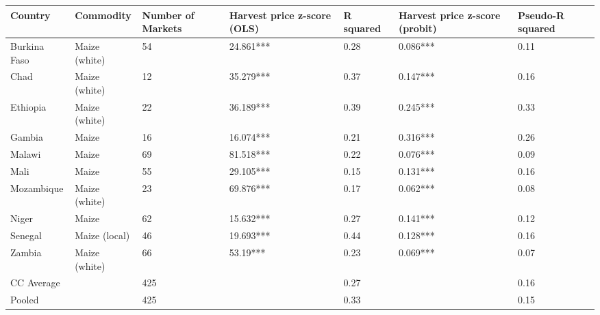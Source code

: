 \begin{table}[ht]
\centering
\begin{tabular}{lllllll}
  \hline
Country & Commodity & Number of Markets & Harvest price z-score (OLS) & R squared & Harvest price z-score (probit) & Pseudo-R squared \\ 
  \hline
Burkina Faso & Maize (white) & 54 & 24.861*** & 0.28 & 0.086*** & 0.11 \\ 
  Chad & Maize (white) & 12 & 35.279*** & 0.37 & 0.147*** & 0.16 \\ 
  Ethiopia & Maize (white) & 22 & 36.189*** & 0.39 & 0.245*** & 0.33 \\ 
  Gambia & Maize & 16 & 16.074*** & 0.21 & 0.316*** & 0.26 \\ 
  Malawi & Maize & 69 & 81.518*** & 0.22 & 0.076*** & 0.09 \\ 
  Mali & Maize & 55 & 29.105*** & 0.15 & 0.131*** & 0.16 \\ 
  Mozambique & Maize (white) & 23 & 69.876*** & 0.17 & 0.062*** & 0.08 \\ 
  Niger & Maize & 62 & 15.632*** & 0.27 & 0.141*** & 0.12 \\ 
  Senegal & Maize (local) & 46 & 19.693*** & 0.44 & 0.128*** & 0.16 \\ 
  Zambia & Maize (white) & 66 & 53.19*** & 0.23 & 0.069*** & 0.07 \\ 
  CC Average &  & 425 &  & 0.27 &  & 0.16 \\ 
  Pooled &  & 425 &  & 0.33 &  & 0.15 \\ 
   \hline
\end{tabular}
\end{table}
